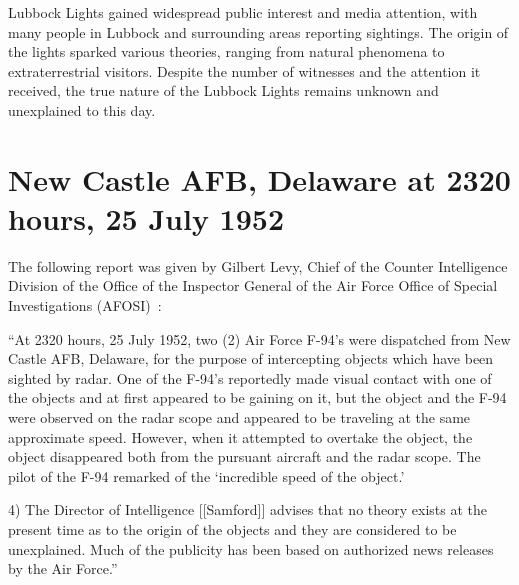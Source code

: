 Lubbock Lights gained widespread public interest and media attention, with many people in Lubbock and surrounding areas reporting sightings. The origin of the lights sparked various theories, ranging from natural phenomena to extraterrestrial visitors. Despite the number of witnesses and the attention it received, the true nature of the Lubbock Lights remains unknown and unexplained to this day.

\section{New Castle AFB, Delaware at 2320 hours, 25 July 1952}

\label{2023-UFO-part-History-chapter-post-1945-pre-1953.tex-ncd}

The following report was given by Gilbert Levy, Chief of the Counter Intelligence
Division of the Office of the Inspector General of the Air Force Office of Special Investigations (AFOSI)~\cite{Maccabee-1952}:
\begin{svgraybox}
``At 2320 hours, 25 July 1952, two (2) Air Force F-94's were dispatched from New Castle AFB, Delaware, for the purpose of intercepting objects which have been sighted by radar. One of the F-94's reportedly made visual contact with one of the objects and at first appeared to be gaining on it, but the object and the F-94 were observed on the radar scope
and appeared to be traveling at the same approximate speed. However, when it attempted to overtake the object, the object disappeared both from the pursuant aircraft and the radar scope. The pilot of the F-94 remarked of  the `incredible speed of the object.'

4) The Director of Intelligence [[Samford]] advises that no theory exists at the present time as to the origin of the objects
and they are considered to be unexplained.
Much of the publicity has been based on authorized news releases by the Air Force.''
\end{svgraybox}


